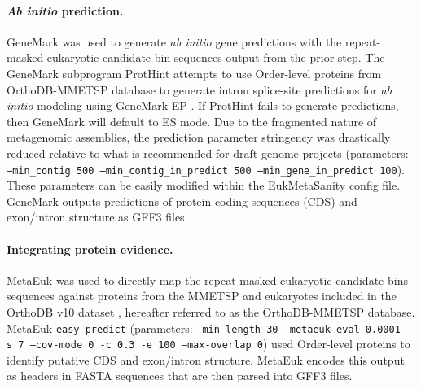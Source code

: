 \documentclass[12pt]{article}
\numberwithin{equation}{section}
\begin{document}
\paragraph{\textit{Ab initio} prediction.}  GeneMark \citep{Lomsadze2005} was used to generate \textit{ab initio} gene predictions with the repeat-masked eukaryotic candidate bin sequences output from the prior step. The GeneMark subprogram ProtHint attempts to use Order-level proteins from OrthoDB-MMETSP database to generate intron splice-site predictions for \textit{ab initio} modeling using GeneMark EP  \citep{Bruna2020}. If ProtHint fails to generate predictions, then GeneMark will default to ES mode. Due to the fragmented nature of metagenomic assemblies, the prediction parameter stringency was drastically reduced relative to what is recommended for draft genome projects (parameters: \texttt{--min\_contig 500 --min\_contig\_in\_predict 500 --min\_gene\_in\_predict 100}). These parameters can be easily modified within the EukMetaSanity config file. GeneMark outputs predictions of protein coding sequences (CDS) and exon/intron structure as GFF3 files. 


\paragraph{Integrating protein evidence.} MetaEuk \citep{LevyKarin2020} was used to directly map the repeat-masked eukaryotic candidate bins sequences against proteins from the MMETSP \citep{Keeling2014, Johnson2018Re-assembly} and eukaryotes included in the OrthoDB v10 dataset \citep{Kriventseva2018}, hereafter referred to as the OrthoDB-MMETSP database. MetaEuk \texttt{easy-predict} (parameters: \texttt{--min-length 30 --metaeuk-eval 0.0001 -s 7 --cov-mode 0 -c 0.3 -e 100 --max-overlap 0}) used Order-level proteins to identify putative CDS and exon/intron structure. MetaEuk encodes this output as headers in FASTA sequences that are then parsed into GFF3 files. 
\end{document}
